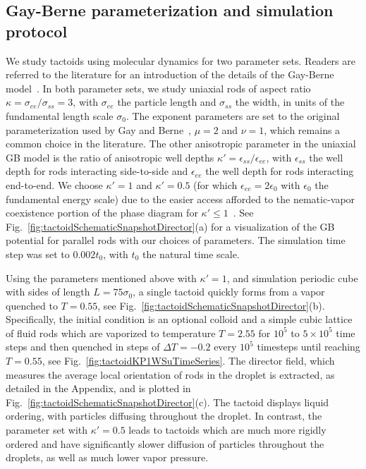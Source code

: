 \documentclass[%
 aip,
 amsmath,amssymb,
 reprint,%
]{revtex4-1}
\begin{document}
\subsection{Gay-Berne parameterization and simulation protocol} \label{ss:tactoidGBParameterization}
We study tactoids using molecular dynamics for two parameter sets. Readers are referred to the literature for an introduction of the details of the Gay-Berne model~\cite{Plimpton09}. In both parameter sets, we study uniaxial rods of aspect ratio $\kappa=\sigma_{ee}/\sigma_{ss}=3$, with $\sigma_{ee}$ the particle length and $\sigma_{ss}$ the width, in units of the fundamental length scale $\sigma_0$. The exponent parameters are set to the original parameterization used by Gay and Berne~\cite{GayBerne}, $\mu=2$ and $\nu=1$, which remains a common choice in the literature. The other anisotropic parameter in the uniaxial GB model is the ratio of anisotropic well depths $\kappa'=\epsilon_{ss}/\epsilon_{ee}$, with $\epsilon_{ss}$ the well depth for rods interacting side-to-side and $\epsilon_{ee}$ the well depth for rods interacting end-to-end. We choose $\kappa' = 1$ and $\kappa' = 0.5$ (for which $\epsilon_{ee}=2\epsilon_0$ with $\epsilon_0$ the fundamental energy scale) due to the easier access afforded to the nematic-vapor coexistence portion of the phase diagram for $\kappa'\leq 1$~\cite{Fernandez12}. See Fig.~\ref{fig:tactoidSchematicSnapshotDirector}(a) for a visualization of the GB potential for parallel rods with our choices of parameters. The simulation time step was set to $0.002t_0$, with $t_0$ the natural time scale.

Using the parameters mentioned above with $\kappa'=1$, and simulation periodic cube with sides of length $L=75\sigma_0$, a single tactoid quickly forms from a vapor quenched to $T=0.55$, see Fig.~\ref{fig:tactoidSchematicSnapshotDirector}(b). Specifically, the initial condition is an optional colloid and a simple cubic lattice of fluid rods which are vaporized to temperature $T=2.55$ for $10^5$ to $5\times 10^5$ time steps and then quenched in steps of $\Delta T=-0.2$ every $10^5$ timesteps until reaching $T=0.55$, see Fig.~\ref{fig:tactoidKP1WSuTimeSeries}. The director field, which measures the average local orientation of rods in the droplet is extracted, as detailed in the Appendix, and is plotted in Fig.~\ref{fig:tactoidSchematicSnapshotDirector}(c). The tactoid displays liquid ordering, with particles diffusing throughout the droplet. In contrast, the parameter set with $\kappa'=0.5$ leads to tactoids which are much more rigidly ordered and have significantly slower diffusion of particles throughout the droplets, as well as much lower vapor pressure.
\end{document}
